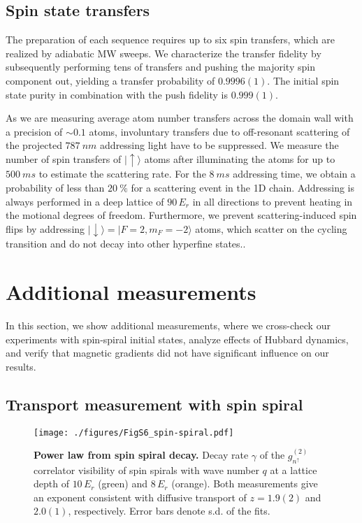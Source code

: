 \documentclass[
 reprint,
 superscriptaddress,
 amsmath,amssymb,
 aps,
 pra,
]{revtex4-2}
\newcommand{\ket}[1]{\ensuremath{\lvert #1 \rangle}\xspace}%
\begin{document}
\subsection{Spin state transfers}

The preparation of each sequence requires up to six spin transfers, which are realized by adiabatic MW sweeps. We characterize the transfer fidelity by subsequently performing tens of transfers and pushing the majority spin component out, yielding a transfer probability of $0.9996 (1)$. The initial spin state purity in combination with the push fidelity is $0.999 (1)$.

As we are measuring average atom number transfers across the domain wall with a precision of $\sim 0.1$ atoms, involuntary transfers due to off-resonant scattering of the projected $\SI{787}{nm}$ addressing light have to be suppressed. We measure the number of spin transfers of $\ket{\uparrow}$ atoms after illuminating the atoms for up to $\SI{500}{ms}$ to estimate the scattering rate. For the $\SI{8}{ms}$ addressing time, we obtain a probability of less than $\SI{20}{\percent}$ for a scattering event in the 1D chain. Addressing is always performed in a deep lattice of $90\,E_r$ in all directions to prevent heating in the motional degrees of freedom.
Furthermore, we prevent scattering-induced spin flips by addressing $\ket{\downarrow} = \ket{F=2, m_F=-2}$ atoms, which scatter on the cycling transition and do not decay into other hyperfine states..



\section{\label{sec:add-meas}Additional measurements}

In this section, we show additional measurements, where we cross-check our experiments with spin-spiral initial states, analyze effects of Hubbard dynamics, and verify that magnetic gradients did not have significant influence on our results.


\subsection{Transport measurement with spin spiral}

\begin{figure}
    \centering
    \texttt{[image: ./figures/FigS6\_spin-spiral.pdf]}
    \caption{\textbf{Power law from spin spiral decay.}
        Decay rate $\gamma$ of the $g_{n^\uparrow}^{(2)}$ correlator visibility of spin spirals with wave number $q$ at a lattice depth of $10\,E_r$ (green) and $8\,E_r$ (orange). Both measurements give an exponent consistent with diffusive transport of $z = 1.9 (2)$ and $2.0 (1)$, respectively.
        Error bars denote s.d. of the fits.
    }
    \label{fig:spin-spiral}
\end{figure}
\end{document}
